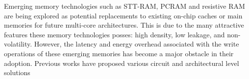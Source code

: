 Emerging memory technologies such as STT-RAM, PCRAM and resistive RAM are being
explored as potential
replacements to existing on-chip caches or main memories for future multi-core
architectures. This is
due to the many attractive features these memory technologies posses: high
density, low leakage, and
non-volatility. However, the latency and energy overhead associated with the
write operations of
these emerging memories has become a major obstacle in their adoption. Previous
works have proposed
various circuit and architectural level solutions

